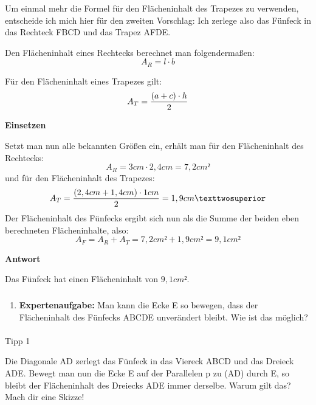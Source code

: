 \documentclass[
  ngerman,
]{book}
\providecommand{\tightlist}{%
  \setlength{\itemsep}{0pt}\setlength{\parskip}{0pt}}
\begin{document}
Um einmal mehr die Formel für den Flächeninhalt des Trapezes zu verwenden, entscheide ich mich hier für den zweiten Vorschlag: Ich zerlege also das Fünfeck in das Rechteck FBCD und das Trapez AFDE.

Den Flächeninhalt eines Rechtecks berechnet man folgendermaßen:
\[A_R = l \cdot b\]

Für den Flächeninhalt eines Trapezes gilt:
\[A_T = {(a+c) \cdot h \over 2}\]

\textbf{Einsetzen}

Setzt man nun alle bekannten Größen ein, erhält man für den Flächeninhalt des Rechtecks:
\[A_R = 3cm \cdot 2,4cm = 7,2cm²\]
und für den Flächeninhalt des Trapezes:
\[A_T = {(2,4cm+1,4cm) \cdot 1cm \over 2} = 1,9cm²\]
Der Flächeninhalt des Fünfecks ergibt sich nun als die Summe der beiden eben berechneten Flächeninhalte, also:
\[A_F = A_R + A_T = 7,2 cm ² + 1,9 cm² = 9,1cm²\]

\textbf{Antwort}

Das Fünfeck hat einen Flächeninhalt von \(9,1cm²\).

\hypertarget{section-18}{%
\subsubsection*{}\label{section-18}}

\begin{enumerate}
\def\labelenumi{\alph{enumi})}
\setcounter{enumi}{1}
\tightlist
\item
  \textbf{Expertenaufgabe:} Man kann die Ecke E so bewegen, dass der Flächeninhalt des Fünfecks ABCDE unverändert bleibt. Wie ist das möglich?
\end{enumerate}

\hypertarget{section-19}{%
\paragraph*{}\label{section-19}}

Tipp 1

Die Diagonale AD zerlegt das Fünfeck in das Viereck ABCD und das Dreieck ADE. Bewegt man nun die Ecke E auf der Parallelen p zu (AD) durch E, so bleibt der Flächeninhalt des Dreiecks ADE immer derselbe. Warum gilt das? Mach dir eine Skizze!

\hypertarget{section-20}{%
\paragraph*{}\label{section-20}}
\end{document}
